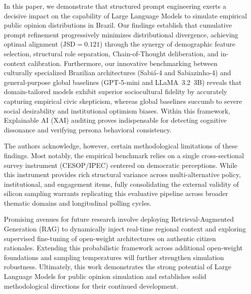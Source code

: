 In this paper, we demonstrate that structured prompt engineering exerts a
decisive impact on the capability of Large Language Models to simulate empirical
public opinion distributions in Brazil. Our findings establish that cumulative
prompt refinement progressively minimizes distributional divergence, achieving
optimal alignment ($\text{JSD} = 0.121$) through the synergy of demographic
feature selection, structural role separation, Chain-of-Thought deliberation,
and in-context calibration. Furthermore, our innovative benchmarking between
culturally specialized Brazilian architectures (Sabiá-4 and Sabiazinho-4) and
general-purpose global baselines (GPT-5-mini and LLaMA~3.2~3B) reveals that
domain-tailored models exhibit superior sociocultural fidelity by accurately
capturing empirical civic skepticism, whereas global baselines succumb to severe
social desirability and institutional optimism biases. Within this framework,
Explainable AI (XAI) auditing proves indispensable for detecting cognitive
dissonance and verifying persona behavioral consistency.

The authors acknowledge, however, certain methodological limitations of these
findings. Most notably, the empirical benchmark relies on a single
cross-sectional survey instrument (CESOP/IPEC) centered on democratic
perceptions. While this instrument provides rich structural variance across
multi-alternative policy, institutional, and engagement items, fully
consolidating the external validity of silicon sampling warrants replicating
this evaluative pipeline across broader thematic domains and longitudinal
polling cycles.

Promising avenues for future research involve deploying Retrieval-Augmented
Generation (RAG) to dynamically inject real-time regional context and exploring
supervised fine-tuning of open-weight architectures on authentic citizen
rationales. Extending this probabilistic framework across additional open-weight
foundations and sampling temperatures will further strengthen simulation
robustness. Ultimately, this work demonstrates the strong potential of Large
Language Models for public opinion simulation and establishes solid
methodological directions for their continued development.

